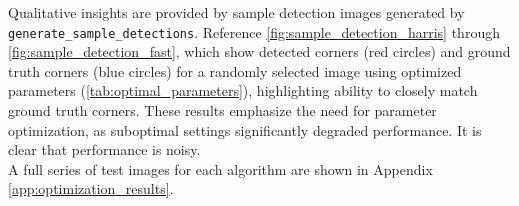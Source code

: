 \documentclass[journal]{IEEEtran}
\begin{document}
Qualitative insights are provided by sample detection images generated by \texttt{generate\_sample\_detections}. Reference \cref{fig:sample_detection_harris} through \cref{fig:sample_detection_fast}, which show detected corners (red circles) and ground truth corners (blue circles) for a randomly selected image using optimized parameters (\cref{tab:optimal_parameters}), highlighting ability to closely match ground truth corners. These results emphasize the need for parameter optimization, as suboptimal settings significantly degraded performance. It is clear that performance is noisy.\\

A full series of test images for each algorithm are shown in Appendix \ref{app:optimization_results}.

\begin{figure}
    \centering
\end{figure}
\end{document}
